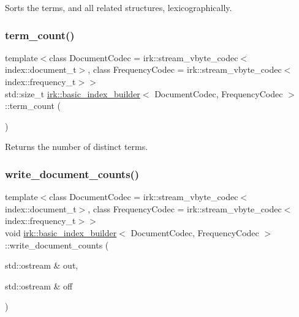 Sorts the terms, and all related structures, lexicographically. 

\mbox{\label{classirk_1_1basic__index__builder_a3e3ae890adf282fda311ede956c82a15}} 
\subsubsection{\texorpdfstring{term\+\_\+count()}{term\_count()}}
{\footnotesize\ttfamily template$<$class Document\+Codec  = irk\+::stream\+\_\+vbyte\+\_\+codec$<$index\+::document\+\_\+t$>$, class Frequency\+Codec  = irk\+::stream\+\_\+vbyte\+\_\+codec$<$index\+::frequency\+\_\+t$>$$>$ \\
std\+::size\+\_\+t \mbox{\hyperlink{classirk_1_1basic__index__builder}{irk\+::basic\+\_\+index\+\_\+builder}}$<$ Document\+Codec, Frequency\+Codec $>$\+::term\+\_\+count (\begin{DoxyParamCaption}{ }\end{DoxyParamCaption})\hspace{0.3cm}{\ttfamily [inline]}}



Returns the number of distinct terms. 

\mbox{\label{classirk_1_1basic__index__builder_a4bc9da9cf70f4e799d47c97644742616}} 
\subsubsection{\texorpdfstring{write\+\_\+document\+\_\+counts()}{write\_document\_counts()}}
{\footnotesize\ttfamily template$<$class Document\+Codec  = irk\+::stream\+\_\+vbyte\+\_\+codec$<$index\+::document\+\_\+t$>$, class Frequency\+Codec  = irk\+::stream\+\_\+vbyte\+\_\+codec$<$index\+::frequency\+\_\+t$>$$>$ \\
void \mbox{\hyperlink{classirk_1_1basic__index__builder}{irk\+::basic\+\_\+index\+\_\+builder}}$<$ Document\+Codec, Frequency\+Codec $>$\+::write\+\_\+document\+\_\+counts (\begin{DoxyParamCaption}\item[{std\+::ostream \&}]{out,  }\item[{std\+::ostream \&}]{off }\end{DoxyParamCaption})\hspace{0.3cm}{\ttfamily [inline]}}



